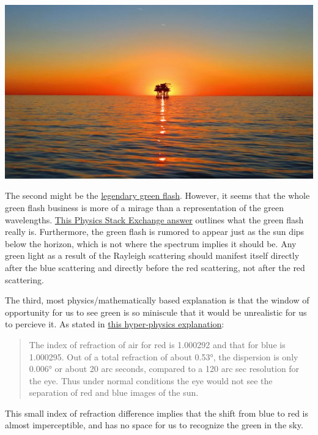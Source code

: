 \documentclass[12pt]{article}
\begin{document}
\begin{center}
\includegraphics[width=6in]{green-sky.jpg}
\end{center}

The second might be the
\href{https://www.youtube.com/watch?v=gGgcZkxEWEc}{legendary green
flash}. However, it seems that the whole green flash business is more of
a mirage than a representation of the green wavelengths.
\href{http://physics.stackexchange.com/a/137211}{This Physics Stack
Exchange answer} outlines what the green flash really is. Furthermore,
the green flash is rumored to appear just as the sun dips below the
horizon, which is not where the spectrum implies it should be. Any green
light as a result of the Rayleigh scattering should manifest itself
directly after the blue scattering and directly before the red
scattering, not after the red scattering.

The third, most physics/mathematically based explanation is that the
window of opportunity for us to see green is so miniscule that it would
be unrealistic for us to percieve it. As stated in
\href{http://hyperphysics.phy-astr.gsu.edu/hbase/atmos/redsun.html}{this
hyper-physics explanation}:

\begin{quote}
The index of refraction of air for red is 1.000292 and that for blue is
1.000295. Out of a total refraction of about 0.53°, the dispersion is
only 0.006° or about 20 arc seconds, compared to a 120 arc sec
resolution for the eye. Thus under normal conditions the eye would not
see the separation of red and blue images of the sun.
\end{quote}

This small index of refraction difference implies that the shift from
blue to red is almost imperceptible, and has no space for us to
recognize the green in the sky.
\end{document}
